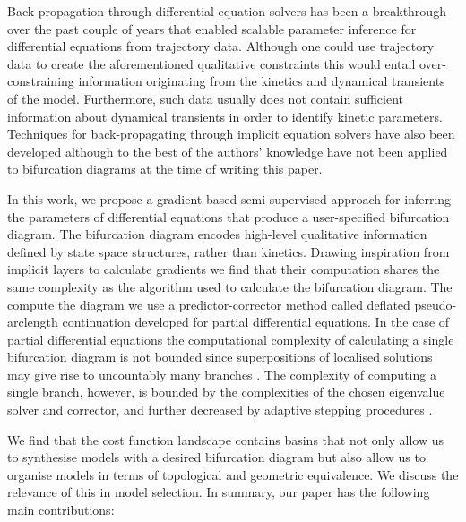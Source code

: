 Back-propagation through differential equation solvers has been a breakthrough over the past couple of years \cite{Chen2018NeuralEquations,Rackauckas2019DiffEqFlux.jl-AEquations} that enabled scalable parameter inference for differential equations from trajectory data. Although one could use trajectory data to create the aforementioned qualitative constraints \cite{Ranciati2017BayesianParameters,Khadivar2021LearningBifurcations} this would entail over-constraining information originating from the kinetics and dynamical transients of the model. Furthermore, such data usually does not contain sufficient information about dynamical transients in order to identify kinetic parameters. Techniques for back-propagating through implicit equation solvers have also been developed \cite{Look2020DifferentiableLayers,Bai2019DeepModels} although to the best of the authors' knowledge have not been applied to bifurcation diagrams at the time of writing this paper.

In this work, we propose a gradient-based semi-supervised approach for inferring the parameters of differential equations that produce a user-specified bifurcation diagram. The bifurcation diagram encodes high-level qualitative information defined by state space structures, rather than kinetics. Drawing inspiration from implicit layers \cite{Look2020DifferentiableLayers,Bai2019DeepModels} to calculate gradients we find that their computation shares the same  complexity as the algorithm used to calculate the bifurcation diagram. The compute the diagram we use a predictor-corrector method called deflated pseudo-arclength continuation \cite{Farrell2016TheDiagrams,Veltz2019PseudoArcLengthContinuation.jl} developed for partial differential equations. In the case of partial differential equations the computational complexity of calculating a single bifurcation diagram is not bounded since superpositions of localised solutions may give rise to uncountably many branches \cite{Avitabile2010ToEquation}. The complexity of computing a single branch, however, is bounded by the complexities of the chosen eigenvalue solver and corrector, and further decreased by adaptive stepping procedures \cite{Aruliah2016AlgorithmContinuation}.

We find that the cost function landscape contains basins that not only allow us to synthesise models with a desired bifurcation diagram but also allow us to organise models in terms of topological and geometric equivalence. We discuss the relevance of this in model selection. In summary, our paper has the following main contributions:

